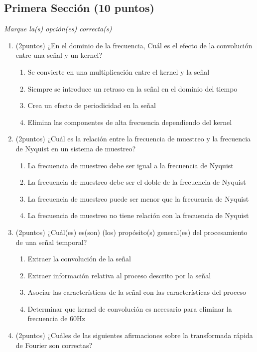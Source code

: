 \documentclass[12pt,a4paper]{article}
\providecommand{\tightlist}{%
  \setlength{\itemsep}{0pt}\setlength{\parskip}{0pt}}\usepackage{longtable,booktabs,array}
\providecommand{\tightlist}{%
  \setlength{\itemsep}{0pt}\setlength{\parskip}{2pt}}
\begin{document}
\setcounter{page}{2} %
\subsection{Primera Sección (10
puntos)}\label{primera-secciuxf3n-10-puntos}

\emph{Marque la(s) opción(es) correcta(s)}

\begin{enumerate}
\tightlist
\item
  (2puntos) ¿En el dominio de la frecuencia, Cuál es el efecto de la
  convolución entre una señal y un kernel?

  \begin{enumerate}
  \tightlist
  \item
    Se convierte en una multiplicación entre el kernel y la señal
  \item
    Siempre se introduce un retraso en la señal en el dominio del tiempo
  \item
    Crea un efecto de periodicidad en la señal
  \item
    Elimina las componentes de alta frecuencia dependiendo del kernel
  \end{enumerate}
\item
  (2puntos) ¿Cuál es la relación entre la frecuencia de muestreo y la
  frecuencia de Nyquist en un sistema de muestreo?

  \begin{enumerate}
  \tightlist
  \item
    La frecuencia de muestreo debe ser igual a la frecuencia de Nyquist
  \item
    La frecuencia de muestreo debe ser el doble de la frecuencia de
    Nyquist
  \item
    La frecuencia de muestreo puede ser menor que la frecuencia de
    Nyquist
  \item
    La frecuencia de muestreo no tiene relación con la frecuencia de
    Nyquist
  \end{enumerate}
\item
  (2puntos) ¿Cuál(es) es(son) (los) propósito(s) general(es) del
  procesamiento de una señal temporal?

  \begin{enumerate}
  \tightlist
  \item
    Extraer la convolución de la señal
  \item
    Extraer información relativa al proceso descrito por la señal
  \item
    Asociar las características de la señal con las características del
    proceso
  \item
    Determinar que kernel de convolución es necesario para eliminar la
    frecuencia de 60Hz
  \end{enumerate}
\item
  (2puntos) ¿Cuáles de las siguientes afirmaciones sobre la transformada
  rápida de Fourier son correctas?


\end{enumerate}
\end{document}
